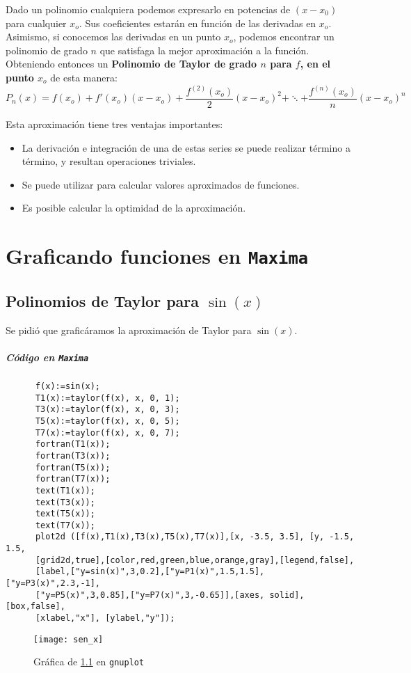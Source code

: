 \documentclass[a4paper]{article}
\begin{document}
Dado un polinomio cualquiera podemos expresarlo en potencias de $(x-x_0)$ para cualquier $x_o$. Sus coeficientes estarán en función de las derivadas en $x_o$. Asimismo, si conocemos las derivadas en un punto $x_o$, podemos encontrar un polinomio de grado $n$ que satisfaga la mejor aproximación a la función. Obteniendo entonces un \textbf{Polinomio de Taylor de grado $n$ para $f$, en el punto $x_o$} de esta manera:
$$P_n(x)=f(x_o)+f'(x_o)(x-x_o)+\frac{f^{(2)}(x_o)}{2}(x-x_o)^2+\ddots+\frac{f^{(n)}(x_o)}{n}(x-x_o)^n$$

Esta aproximación tiene tres ventajas importantes:
\begin{itemize}
\item La derivación e integración de una de estas series se puede realizar término a término, y resultan operaciones triviales.
\item Se puede utilizar para calcular valores aproximados de funciones.
\item Es posible calcular la optimidad de la aproximación.
\end{itemize}

\section{Graficando funciones en \texttt{Maxima}}
  \subsection{Polinomios de Taylor para $\sin(x)$}
  \label{1}
    Se pidió que graficáramos la aproximación de Taylor para $\sin(x)$.
    
    \subparagraph{Código en \texttt{Maxima}}
      \begin{verbatim}
      f(x):=sin(x);
      T1(x):=taylor(f(x), x, 0, 1);
      T3(x):=taylor(f(x), x, 0, 3);
      T5(x):=taylor(f(x), x, 0, 5);
      T7(x):=taylor(f(x), x, 0, 7);
      fortran(T1(x));
      fortran(T3(x));
      fortran(T5(x));
      fortran(T7(x));
      text(T1(x));
      text(T3(x));
      text(T5(x));
      text(T7(x));
      plot2d ([f(x),T1(x),T3(x),T5(x),T7(x)],[x, -3.5, 3.5], [y, -1.5, 1.5,
      [grid2d,true],[color,red,green,blue,orange,gray],[legend,false],
      [label,["y=sin(x)",3,0.2],["y=P1(x)",1.5,1.5],["y=P3(x)",2.3,-1],
      ["y=P5(x)",3,0.85],["y=P7(x)",3,-0.65]],[axes, solid],[box,false],
      [xlabel,"x"], [ylabel,"y"]);
      \end{verbatim}
      
      \begin{figure}[H]
        \centering
        \texttt{[image: sen\_x]}
        \caption{Gráfica de \ref{1} en \texttt{gnuplot}}
      \end{figure}
\end{document}
